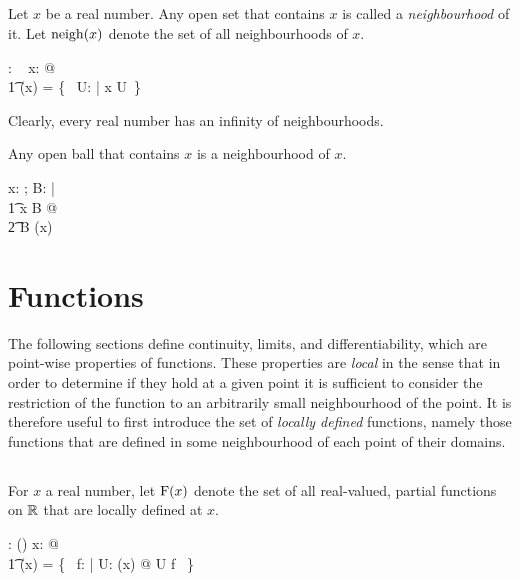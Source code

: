 \documentclass[11pt, oneside]{article}
\begin{document}
\subsection{}

Let $x$ be a real number.
Any open set that contains $x$ is called a {\it neighbourhood} of it.
Let $\operatorname{neigh}(x)$ denote the set of all neighbourhoods of $x$.

\begin{axdef}
	\neighR: \R \fun \family~\R
\where
	\forall x: \R @ \\
	\t1	\neighR(x) = \{~ U: \openR | x \in U~\}
\end{axdef}

Clearly, every real number has an infinity of neighbourhoods.

\begin{remark}
Any open ball that contains $x$ is a neighbourhood of $x$.

\begin{zed}
	\forall x: \R; B: \ballsR | \\
	\t1	x \in B @ \\
	\t2		B \in \neighR(x)
\end{zed}

\end{remark}

\section{Functions}

The following sections define continuity, limits, and differentiability, which are point-wise properties of functions.
These properties are {\it local} in the sense that in order to determine if they hold at a given point it is sufficient to
consider the restriction of the function to an arbitrarily small neighbourhood of the point.
It is therefore useful to first introduce the set of {\it locally defined} functions, 
namely those functions that are defined in some neighbourhood of each point of  their domains.

\subsection{}

For $x$ a real number,
let $\operatorname{F}(x)$ denote the set of all real-valued, partial functions on $\mathbb{R}$ that are locally defined at $x$.

\begin{axdef}
	\FunR: \R \fun \power(\R \pfun \R)
\where
	\forall x: \R @ \\
	\t1	\FunR(x) = \{~ f: \R \pfun \R | \exists U: \neighR(x) @ U \subseteq \dom f ~\}
\end{axdef}
\end{document}
